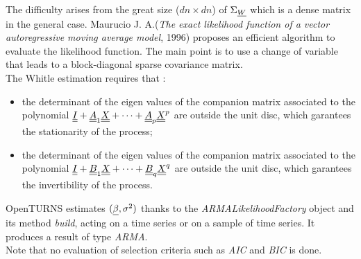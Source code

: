 The difficulty arises from the great size ($dn \times dn$) of $\Sigma_{{\underline{W}}}$ which is a dense matrix in the general case. Maurucio J. A.(\emph{The exact likelihood function of a vector autoregressive moving average model}, 1996) proposes an efficient algorithm to evaluate the likelihood function. The main point is to use a change of variable that leads to a block-diagonal sparse covariance matrix.\\

The Whitle estimation requires that :
\begin{itemize}
\item the determinant of the eigen values of the companion matrix associated to the polynomial  ${\underline{\underline{I}}} + {\underline{\underline{A}}}_1{\underline{\underline{X}}} + \dots + {\underline{\underline{A}}}_p{\underline{\underline{X}}}^p$ are outside the unit disc, which garantees the stationarity of the process;
\item the determinant of the eigen values of the companion matrix associated to the polynomial  ${\underline{\underline{I}}} + {\underline{\underline{B}}}_1{\underline{\underline{X}}} + \dots + {\underline{\underline{B}}}_q{\underline{\underline{X}}}^q$ are outside the unit disc, which garantees the invertibility of the process.
\end{itemize}

OpenTURNS estimates $({\underline{\beta}}, \sigma^2)$  thanks to the \emph{ARMALikelihoodFactory} object and its method \emph{build}, acting on a time series or on a sample of time series. It produces a result of type \emph{ARMA}. \\

Note that no evaluation of selection criteria such as \textit{AIC} and \textit{BIC} is done. \\


